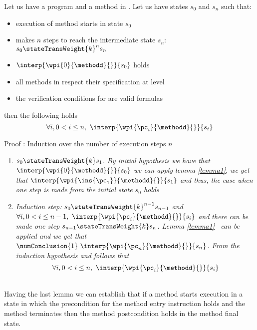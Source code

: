 \begin{lemma}\label{lemma3}
Let us have a program \Program{} and a method \methodd{} in \Program.
 Let us have states  $s_{0}$ and $s_n$ such that: 
\begin{itemize} 
     \item execution of method  \methodd{} starts  in state $s_{0}$ 
     \item  makes $n$ steps to reach the intermediate state $s_n$: $s_{0} \stateTransWeight{k}^{n} s_{n} $
     \item $\interp{ \wpi{0 } {\methodd}{}}{ s_{0}}$ holds
     \item all methods in \Program{} respect their specification at level   
     \item the verification conditions for \Program{} are valid formulas
\end{itemize}  
 then the following holds
$$\forall i,  0 < i \le n, \  \interp{ \wpi{\pc_i} {\methodd}{ }}{ s_{i}} $$

\end{lemma}
Proof : Induction over the number of execution steps $n$
\begin{enumerate}
    \item\textit{ $s_{0} \stateTransWeight{k} s_{1}$. By initial hypothesis we have that  $\interp{ \wpi{0 } {\methodd}{}}{ s_{0}}$
             we can apply lemma \ref{lemma1}, we get that 
             $\interp{ \wpi{\ins{\pc_{1}}}{\methodd}{  } } { s_{1} }  $ and thus, the  case when one step is made from the initial state
             $s_0$  holds}   
    \item \textit{Induction step:   $s_{0} \stateTransWeight{k}^{n - 1} s_{n - 1}$ and \\
           $\forall i,  0 < i \le n - 1, \  \interp{ \wpi{\pc_i} {\methodd}{}}{ s_{i}} $
           and there can be made one step $s_{n- 1} \stateTransWeight{k} s_n$.  Lemma \ref{lemma1} \ can be applied and we get that
           $\numConclusion{1} \ \interp{ \wpi{\pc_n } {\methodd}{ } }{ s_{n}} $. 
	   From the induction hypothesis and  follows that 
	   $$\forall i,  0 < i \le n, \  \interp{ \wpi{\pc_i } {\methodd}{ }}{ s_{i}} $$ }
\end{enumerate}
\Qed \\

Having the last lemma we can  establish that if a method starts
execution in a state in which the \fwpi{} precondition  for the method entry instruction 
holds and the method terminates then the method postcondition holds in the method final state.


